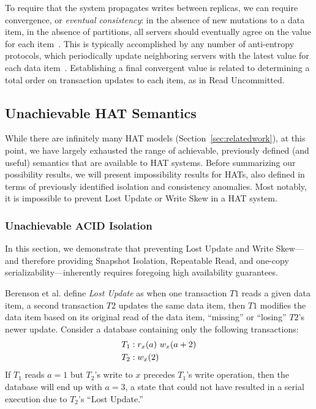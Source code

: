 \vspace{.5em} To require that the
system propagates writes between replicas, we can require convergence,
or \textit{eventual consistency}: in the absence of new mutations to a
data item, in the absence of partitions, all servers should eventually
agree on the value for each item~\cite{cac, vogels-defs}. This is
typically accomplished by any number of anti-entropy protocols, which
periodically update neighboring servers with the latest value for each
data item~\cite{antientropy}. Establishing a final convergent value is
related to determining a total order on transaction updates to each
item, as in Read Uncommitted.

\subsection{Unachievable HAT Semantics}
\label{sec:unachievable-hat}

While there are infinitely many HAT models
(Section~\ref{sec:relatedwork}), at this point, we have largely
exhausted the range of achievable, previously defined (and useful)
semantics that are available to HAT systems. Before summarizing our
possibility results, we will present impossibility results for HATs,
also defined in terms of previously identified isolation and
consistency anomalies. Most notably, it is impossible to
prevent Lost Update or Write Skew in a HAT system.

\subsubsection{Unachievable ACID Isolation}
\label{sec:unachievable-acid}

In this section, we demonstrate that preventing Lost Update and Write
Skew---and therefore providing Snapshot Isolation, Repeatable Read,
and one-copy serializability---inherently requires foregoing high
availability guarantees.

Berenson et al. define \textit{Lost Update} as when one
transaction $T1$ reads a given data item, a second transaction $T2$
updates the same data item, then $T1$ modifies the data item based on
its original read of the data item, ``missing'' or ``losing'' $T2$'s
newer update. Consider a database containing only the following
transactions:
\begin{align*}
\small\vspace{-1em}
T_1 &: r_x(a)~w_x(a+2)
\\T_2 &: w_x(2)\vspace{-1em}
\end{align*}
If $T_1$ reads $a=1$ but $T_2$'s write to $x$ precedes $T_1$'s write
operation, then the database will end up with $a=3$, a state that
could not have resulted in a serial execution due to $T_2$'s
``Lost Update.''

